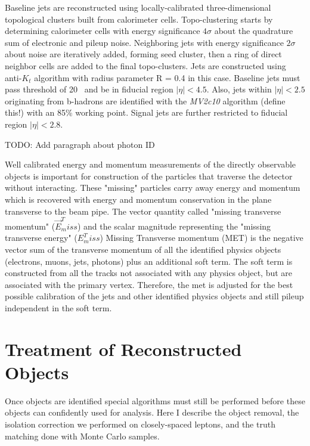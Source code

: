 Baseline jets are reconstructed using locally-calibrated three-dimensional topological clusters built from calorimeter cells.  Topo-clustering starts by determining calorimeter cells with energy significance $4\sigma$ about the quadrature sum of electronic and pileup noise.  Neighboring jets with energy significance $2\sigma$ about noise are iteratively added, forming seed cluster, then a ring of direct neighbor cells are added to the final topo-clusters.  Jets are constructed using anti-$K_t$ algorithm with radius parameter R = 0.4 in this case. Baseline jets must pass \pt{} threshold of 20 ~\GeV and be in fiducial region $|\eta | < 4.5$.  Also, jets within $|\eta | < 2.5$ originating from b-hadrons are identified with the \textit{MV2c10} algorithm (define this!) with an 85\% working point.  Signal jets are further restricted to fiducial region $|\eta | < 2.8$.

TODO: Add paragraph about photon ID

Well calibrated energy and momentum measurements of the directly observable objects is important for construction of the particles that traverse the detector without interacting.  These "missing" particles carry away energy and momentum which is recovered with energy and momentum conservation in the plane transverse to the beam pipe.  The vector quantity called "missing transverse momentum" ($\vec{E}^T_miss$) and the scalar magnitude representing the "missing transverse energy" ($E^T_miss$) 
Missing Transverse momentum (MET) is the negative vector sum of the transverse momentum of all the identified physics objects (electrons, muons, jets, photons) plus an additional soft term.  The soft term is constructed from all the tracks not associated with any physics object, but are associated with the primary vertex.  Therefore, the met is adjusted for the best possible calibration of the jets and other identified physics objects and still pileup independent in the soft term. 

\section{Treatment of Reconstructed Objects}

Once objects are identified special algorithms must still be performed before these objects can confidently used for analysis.  Here I describe the object removal, the isolation correction we performed on closely-spaced leptons, and the truth matching done with Monte Carlo samples.

